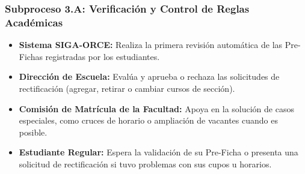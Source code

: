 \subsubsection{Subproceso 3.A: Verificación y Control de Reglas Académicas}

\begin{itemize}
    \item \textbf{Sistema SIGA-ORCE:} Realiza la primera revisión automática de las Pre-Fichas registradas por los estudiantes.

    \item \textbf{Dirección de Escuela:} Evalúa y aprueba o rechaza las solicitudes de rectificación (agregar, retirar o cambiar cursos de sección).

    \item \textbf{Comisión de Matrícula de la Facultad:} Apoya en la solución de casos especiales, como cruces de horario o ampliación de vacantes cuando es posible.

    \item \textbf{Estudiante Regular:} Espera la validación de su Pre-Ficha o presenta una solicitud de rectificación si tuvo problemas con sus cupos u horarios.
\end{itemize}
